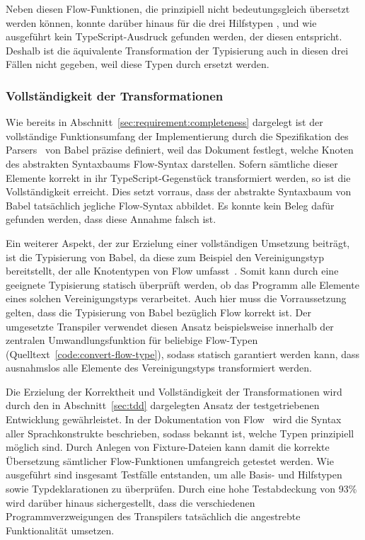 Neben diesen Flow-Funktionen, die prinzipiell nicht bedeutungsgleich übersetzt werden können, konnte darüber hinaus für die drei Hilfstypen ,  und  wie ausgeführt kein TypeScript-Ausdruck gefunden werden, der diesen entspricht. Deshalb ist die äquivalente Transformation der Typisierung auch in diesen drei Fällen nicht gegeben, weil diese Typen durch  ersetzt werden.

\subsubsection{Vollständigkeit der Transformationen}

Wie bereits in Abschnitt~\ref{sec:requirement:completeness} dargelegt ist der vollständige Funktionsumfang der Implementierung durch die Spezifikation des Parsers~\autocite{BABEL:PARSER_SPEC} von Babel präzise definiert, weil das Dokument festlegt, welche Knoten des abstrakten Syntaxbaums Flow-Syntax darstellen. Sofern sämtliche dieser Elemente korrekt in ihr TypeScript-Gegenstück transformiert werden, so ist die Vollständigkeit erreicht. Dies setzt vorraus, dass der abstrakte Syntaxbaum von Babel tatsächlich jegliche Flow-Syntax abbildet. Es konnte kein Beleg dafür gefunden werden, dass diese Annahme falsch ist.

Ein weiterer Aspekt, der zur Erzielung einer vollständigen Umsetzung beiträgt, ist die Typisierung von Babel, da diese zum Beispiel den Vereinigungstyp  bereitstellt, der alle Knotentypen von Flow umfasst~\autocite{BABEL:TYPES}. Somit kann durch eine geeignete Typisierung statisch überprüft werden, ob das Programm alle Elemente eines solchen Vereinigungstyps verarbeitet. Auch hier muss die Vorraussetzung gelten, dass die Typisierung von Babel bezüglich Flow korrekt ist.
Der umgesetzte Transpiler verwendet diesen Ansatz beispielsweise innerhalb der zentralen Umwandlungsfunktion für beliebige Flow-Typen (Quelltext~\ref{code:convert-flow-type}), sodass statisch garantiert werden kann, dass ausnahmslos alle Elemente des Vereinigungstyps  transformiert werden.

Die Erzielung der Korrektheit und Vollständigkeit der Transformationen wird durch den in Abschnitt~\ref{sec:tdd} dargelegten Ansatz der testgetriebenen Entwicklung gewährleistet. In der Dokumentation von Flow~\autocite{FLOW:TYPE_ANNOTATIONS} wird die Syntax aller Sprachkonstrukte beschrieben, sodass bekannt ist, welche Typen prinzipiell möglich sind. Durch Anlegen von Fixture-Dateien kann damit die korrekte Übersetzung sämtlicher Flow-Funktionen umfangreich getestet werden. Wie ausgeführt sind insgesamt \numberOfTests Testfälle entstanden, um alle Basis- und Hilfstypen sowie Typdeklarationen zu überprüfen. Durch eine hohe Testabdeckung von 93\% wird darüber hinaus sichergestellt, dass die verschiedenen Programmverzweigungen des Transpilers tatsächlich die angestrebte Funktionalität umsetzen.

